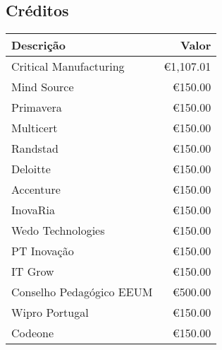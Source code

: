 
\subsection{Créditos}
\begin{tabular}{| l | r |}

\hline
\textbf{Descrição}		& \textbf{Valor} \\ \hline
Critical Manufacturing	& \euro 1,107.01 \\ \hline
Mind Source				& \euro 150.00 \\ \hline
Primavera				& \euro 150.00 \\ \hline
Multicert				& \euro 150.00 \\ \hline
Randstad				& \euro 150.00 \\ \hline
Deloitte				& \euro 150.00 \\ \hline
Accenture				& \euro 150.00 \\ \hline
InovaRia				& \euro 150.00 \\ \hline
Wedo Technologies		& \euro 150.00 \\ \hline
PT Inovação				& \euro 150.00 \\ \hline
IT Grow					& \euro 150.00 \\ \hline
Conselho Pedagógico EEUM & \euro 500.00 \\ \hline
Wipro Portugal			& \euro 150.00 \\ \hline
Codeone					& \euro 150.00 \\ \hline
\end{tabular}


